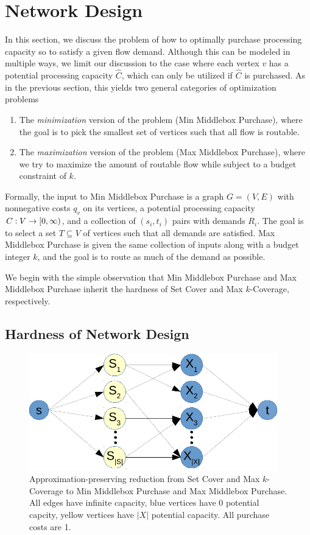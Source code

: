 \section{Network Design}
\label{sec:networkdesign}
In this section, we discuss the problem of how to optimally purchase processing capacity so to satisfy a given flow demand. Although this can be modeled in multiple ways, we limit our discussion to the case where each vertex $v$ has a potential processing capacity $\hat{C}$, which can only be utilized if $\hat{C}$ is purchased.  As in the previous section, this yields two general categories of optimization problems
\begin{enumerate}
	\item The \textit{minimization} version of the problem ({\sc Min Middlebox Purchase}), where the goal is to pick the smallest set of vertices such that all flow is routable.
	\item The \textit{maximization} version of the problem ({\sc Max Middlebox Purchase}), where we try to maximize the amount of routable flow while subject to a budget constraint of $k$. 
\end{enumerate}

Formally, the input to {\sc Min Middlebox Purchase} is a graph $G = (V,E)$ with nonnegative costs $q_v$ on its vertices, a potential processing capacity $C : V \rightarrow {{\ensuremath{[0,\infty)}}}$, and a collection of $(s_i, t_i)$ pairs with demands $R_i$. The goal is to select a set $T \subseteq V$ of vertices such that all demands are satisfied.  {\sc Max Middlebox Purchase} is given the same collection of inputs along with a budget integer $k$, and the goal is to route as much of the demand as possible.

We begin with the simple observation that {\sc Min Middlebox Purchase} and {\sc Max Middlebox Purchase} inherit the hardness of {\sc Set Cover} and {\sc Max $k$-Coverage}, respectively.

\subsection{Hardness of Network Design}
\begin{figure}[t]
\centering
 \includegraphics[height=2in]{images/setcover.pdf}
 \caption{Approximation-preserving reduction from {\sc Set Cover} and {\sc Max $k$-Coverage} to {\sc Min Middlebox Purchase} and {\sc Max Middlebox Purchase}. All edges have infinite capacity, blue vertices have $0$ potential capcity, yellow vertices have $|X|$ potential capacity. All purchase costs are 1.}
\label{fig:setcoverreduction}
\end{figure}

